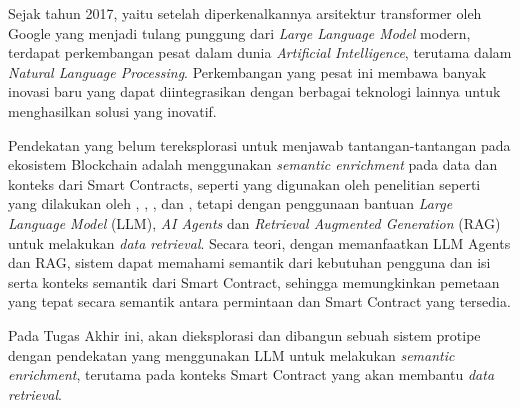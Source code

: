 Sejak tahun 2017, yaitu setelah diperkenalkannya arsitektur transformer oleh Google yang menjadi tulang punggung dari \textit{Large Language Model} modern, terdapat perkembangan pesat dalam dunia \textit{Artificial Intelligence}, terutama dalam \textit{Natural Language Processing}. Perkembangan yang pesat ini membawa banyak inovasi baru yang dapat diintegrasikan dengan berbagai teknologi lainnya untuk menghasilkan solusi yang inovatif.

Pendekatan yang belum tereksplorasi untuk menjawab tantangan-tantangan pada ekosistem Blockchain adalah menggunakan \textit{semantic enrichment} pada data dan konteks dari Smart Contracts, seperti yang digunakan oleh penelitian seperti yang dilakukan oleh \cite{third2017linked}, \cite{shi2021semantic}, \cite{stan}, dan \cite{sopek2018graphchain}, tetapi dengan penggunaan bantuan \textit{Large Language Model} (LLM), \textit{AI Agents} dan \textit{Retrieval Augmented Generation} (RAG) untuk melakukan \textit{data retrieval}. Secara teori, dengan memanfaatkan LLM Agents dan RAG, sistem dapat memahami semantik dari kebutuhan pengguna dan isi serta konteks semantik dari Smart Contract, sehingga memungkinkan pemetaan yang tepat secara semantik antara permintaan dan Smart Contract yang tersedia.


Pada Tugas Akhir ini, akan dieksplorasi dan dibangun sebuah sistem protipe dengan pendekatan yang menggunakan LLM untuk melakukan \textit{semantic enrichment}, terutama pada konteks Smart Contract yang akan membantu \textit{data retrieval}.



